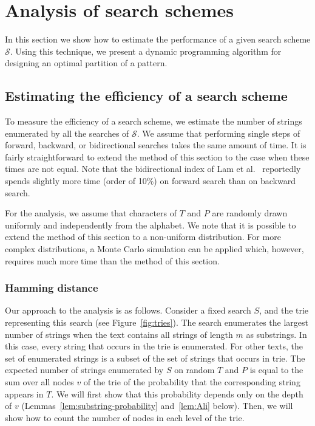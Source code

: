 \documentclass[12pt]{article}
\newcommand{\scheme}{\mathcal{S}}
\newif\iffull
\begin{document}
\section{Analysis of search schemes}\label{sec:analysis}
In this section we show how to estimate the performance of a given search scheme
$\scheme$. Using this technique, we \iffull first explain why an
uneven partition can lead to a better performance, and then \fi present a
dynamic programming algorithm for designing an
optimal partition of a pattern. 

\subsection{Estimating the efficiency of a search scheme}\label{sec:estimation}
To measure the efficiency of a search scheme, we estimate the number of strings
enumerated by all the searches of $\scheme$.
We assume that performing single steps of
forward, backward, or bidirectional searches takes the same amount of time.
It is fairly straightforward to extend the method of this section to the
case when these times are not equal.
Note that the bidirectional index of Lam et al.~\cite{LamLTWWY09}
reportedly spends slightly more time (order of 10\%) on forward search
than on backward search. 

For the analysis, we assume that characters
of $T$ and $P$ are randomly drawn uniformly and independently
from the alphabet.
We note that it is possible to extend the method of this section to a
non-uniform distribution.
For more complex distributions,
a Monte Carlo simulation can be applied
which, however, 
requires much more time than
the method of this section.

\subsubsection{Hamming distance}\label{sec:hamming-estimation}

Our approach to the analysis is as follows.
Consider a fixed search $S$, and the trie representing this search 
(see Figure~\ref{fig:tries}).
The search enumerates the largest number of strings when
the text contains all strings of length $m$ as substrings.
In this case, every string that occurs in the trie is enumerated.
For other texts, the set of enumerated strings is a subset of the set of strings
that occurs in trie.
The expected number of strings enumerated by $S$ on random $T$ and $P$ is equal
to the sum over all nodes $v$ of the trie of the probability
that the corresponding string appears in $T$.
We will first show that this probability depends only on the depth of $v$
(Lemmas~\ref{lem:substring-probability} and~\ref{lem:Ali} below).
Then, we will show how to count the number of nodes in each level of the
trie.
\end{document}
